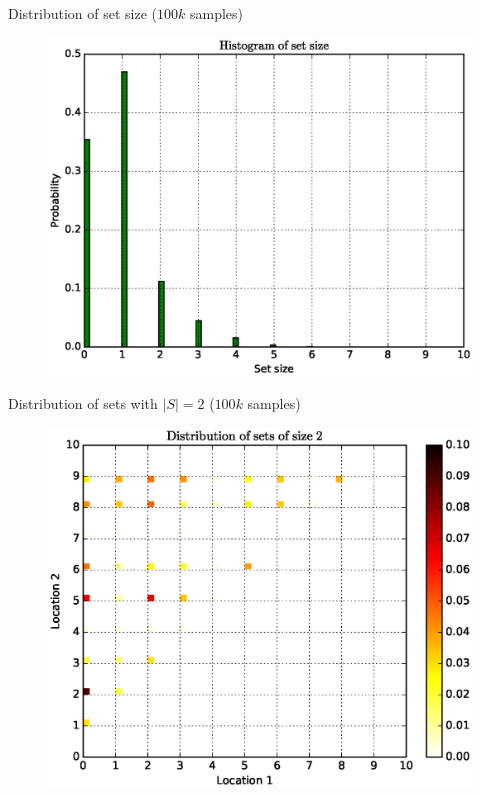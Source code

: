 \documentclass{beamer}
\begin{document}
\begin{frame}{Distribution of set size ($100k$ samples)}
  \begin{figure}
    \centering
    \includegraphics[height=0.8\textheight]{length_histogram_gibbs}
  \end{figure}
\end{frame}

\begin{frame}{Distribution of sets with $|S| = 2$ ($100k$ samples)}
  \begin{figure}
    \centering
    \includegraphics[height=0.8\textheight]{pairs_histogram_gibbs}
  \end{figure}
\end{frame}
\end{document}
